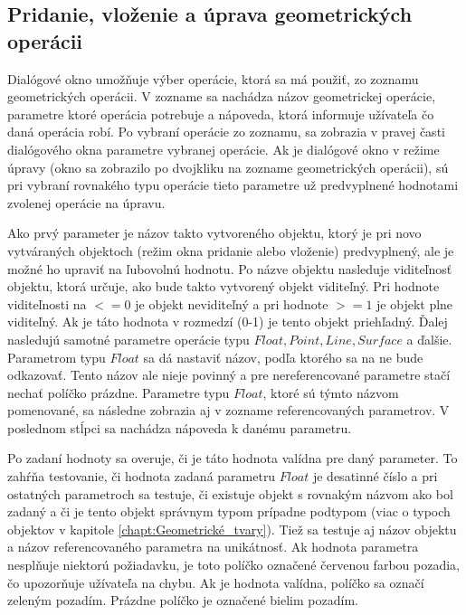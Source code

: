 

\subsection{Pridanie, vloženie a úprava geometrických operácii} 
Dialógové okno umožňuje výber operácie,  ktorá sa má použiť, zo zoznamu geometrických operácii. V zozname sa nachádza názov geometrickej operácie, parametre ktoré operácia potrebuje a nápoveda, ktorá informuje užívateľa čo daná operácia robí.
Po vybraní operácie zo zoznamu, sa zobrazia v pravej časti dialógového okna parametre vybranej operácie. Ak je dialógové okno v režime úpravy (okno sa zobrazilo po dvojkliku na zozname geometrických operácii), sú pri vybraní rovnakého typu operácie tieto parametre už predvyplnené hodnotami zvolenej operácie na úpravu.

Ako prvý parameter je názov takto vytvoreného objektu, ktorý je pri novo vytváraných objektoch (režim okna pridanie alebo vloženie) predvyplnený, ale je možné ho upraviť na ľubovolnú hodnotu.  
Po názve objektu nasleduje viditeľnosť objektu, ktorá určuje, ako bude takto vytvorený objekt viditeľný. Pri hodnote viditeľnosti na $<=0$ je objekt neviditeľný a pri hodnote $>=1$ je objekt plne viditeľný. Ak je táto hodnota v rozmedzí (0-1) je tento objekt priehľadný. 
Ďalej nasledujú samotné parametre operácie typu $Float,  Point, Line, Surface$ a ďalšie. Parametrom typu $Float$ sa dá nastaviť názov, podľa ktorého sa na ne bude odkazovať. Tento názov ale nieje povinný a pre nereferencované parametre stačí nechať políčko prázdne. Parametre typu $Float$, ktoré sú týmto názvom pomenované, sa následne zobrazia aj v zozname referencovaných parametrov.
V poslednom stĺpci sa nachádza nápoveda k danému parametru.

Po zadaní hodnoty sa overuje, či je táto hodnota valídna pre daný parameter. To zahŕňa testovanie, či hodnota zadaná parametru $Float$ je desatinné číslo a pri ostatných parametroch sa testuje, či existuje objekt s rovnakým názvom ako bol zadaný a či je tento objekt správnym typom prípadne podtypom (viac o typoch objektov v kapitole  \ref{chapt:Geometrické_tvary}). Tiež sa testuje aj názov objektu a názov referencovaného parametra na unikátnosť.
Ak hodnota parametra nesplňuje niektorú požiadavku, je toto políčko označené červenou farbou pozadia, čo upozorňuje užívateľa na chybu. Ak je hodnota valídna, políčko sa označí zeleným pozadím. Prázdne políčko je označené bielim pozadím. 


